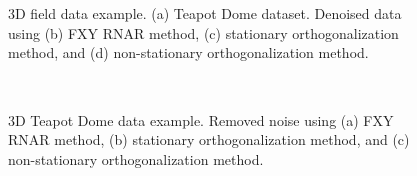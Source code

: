 {%


\begin{figure}[htb!]
\centering
{}
\\
   \\
\caption{3D field data example. (a) Teapot Dome dataset. Denoised data using (b) FXY RNAR method, (c) stationary orthogonalization method, and (d) non-stationary orthogonalization method.}
\label{fig:tea,t-fxy,t-ortho,t-orthon}
\end{figure}

\begin{figure}[htb!]
\centering
{}
   \\
\caption{3D Teapot Dome data example. Removed noise using (a) FXY RNAR method, (b) stationary orthogonalization method, and (c) non-stationary orthogonalization method.}
\label{fig:t-fxy-n0,t-ortho-n0,t-orthon-n0}
\end{figure}


}

